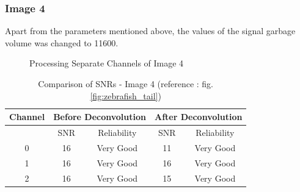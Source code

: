 \documentclass{article}
\begin{document}
\subsubsection*{Image 4}
Apart from the parameters mentioned above, the values of the signal garbage volume was changed to 11600.
\begin{figure}[h!]
\centering
{}
\vspace{5 mm}
\caption{Processing Separate Channels of Image 4}
\label{fig:tuning-image4}
\end{figure}
\begin{table}[h!]
\centering
\caption{Comparison of SNRs - Image 4 (reference : fig. \ref{fig:zebrafish_tail})}
\begin{tabular}{*5c}
\toprule
Channel &  \multicolumn{2}{c}{Before Deconvolution} & \multicolumn{2}{c}{After Deconvolution}\\
\midrule
{}   & SNR   & Reliability    & SNR   & Reliability \\
0   &  16 & Very Good & 11 & Very Good \\
1   &  16 & Very Good & 16 & Very Good \\
2   &  16 & Very Good & 15 & Very Good \\
\bottomrule
\end{tabular}
\end{table}
\end{document}
